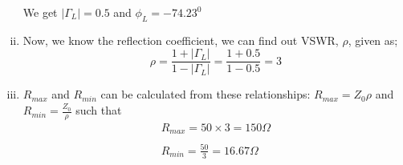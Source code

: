 \begin{example}
\begin{enumerate}[(i)]
We get $|\Gamma_{L}|=0.5$ and $\phi_L = -74.23^0$

\item Now, we know the reflection coefficient, we can find out VSWR, $\rho$, given as;
\begin{dmath*}
\rho=\frac{1 + |\Gamma_{L}|}{1-|\Gamma_{L}|}=\frac{1+0.5}{1-0.5} = 3
\end{dmath*}

\item $R_{max}$ and $R_{min}$ can be calculated from these relationships:
$R_{max} = Z_0\rho$ and $R_{min} = \frac{Z_0}{\rho}$ such that
\begin{align*}
R_{max} = 50 \times 3 = 150\Omega\\\\
R_{min} = \frac{50}{3} = 16.67\Omega
\end{align*}
\end{enumerate}
\end{example}

